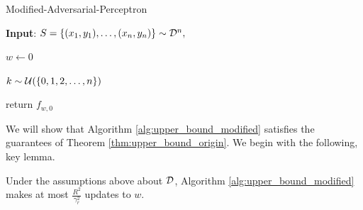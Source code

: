 \begin{algorithm}[H]
   \caption{Modified-Adversarial-Perceptron}
   \label{alg:upper_bound_modified}

    \textbf{Input}:  $S = \{(x_1, y_1), \dots, (x_n, y_n)\} \sim {\mathcal D}^n,$
    
    $w \leftarrow 0$ 
    
    $k \sim {\mathcal U}(\{0, 1, 2, \dots, n\})$
    
     
    return $f_{w, 0}$
\end{algorithm}

We will show that Algorithm \ref{alg:upper_bound_modified} satisfies the guarantees of Theorem \ref{thm:upper_bound_origin}. We begin with the following, key lemma.

\begin{lem}\label{lem:update_count}
Under the assumptions above about ${\mathcal D}$, Algorithm \ref{alg:upper_bound_modified} makes at most $\frac{R^2}{\gamma_r^2}$ updates to $w$.
\end{lem}

